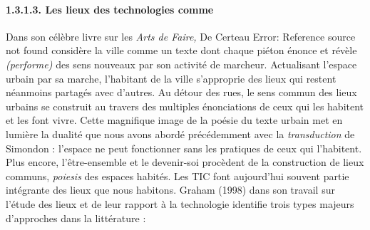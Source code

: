 \paragraph[1.3.1.3. Les lieux des technologies comme ]{1.3.1.3. Les lieux des technologies comme }
\hypertarget{RefHeading231699228146}{}{\color{black}
Dans son c\'el\`ebre livre sur les \textit{Arts de Faire, }De Certeau Error: Reference source not found consid\`ere la
ville comme un texte dont chaque pi\'eton \'enonce et r\'ev\`ele \textit{(performe)} des sens nouveaux par son
activit\'e de marcheur. Actualisant l'espace urbain par sa marche, l'habitant de la ville s'approprie des lieux qui
restent n\'eanmoins partag\'es avec d'autres. Au d\'etour des rues, le sens commun des lieux urbains se construit au
travers des multiples \'enonciations de ceux qui les habitent et les font vivre. Cette magnifique image de la po\'esie
du texte urbain met en lumi\`ere la dualit\'e que nous avons abord\'e pr\'ec\'edemment avec la \textit{transduction }de
Simondon :\textit{ }l'espace ne peut fonctionner sans les pratiques de ceux qui l'habitent. Plus encore,
l'\^etre-ensemble et le devenir-soi proc\`edent de la construction de lieux communs, \textit{poiesis }des espaces
habit\'es. Les TIC font aujourd'hui souvent partie int\'egrante des lieux que nous habitons. Graham (1998) dans son
travail sur l'\'etude des lieux et de leur rapport \`a la technologie %
%
identifie trois types majeurs d'approches dans la litt\'erature :}


\bigskip

